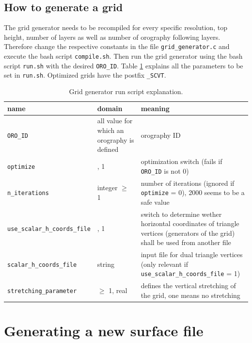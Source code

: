 \documentclass[10pt]{report}
\begin{document}
\section{How to generate a grid}
\label{sec:how_to_generate_a_grid}

The grid generator needs to be recompiled for every specific resolution, top height, number of layers as well as number of orography following layers. Therefore change the respective constants in the file \texttt{grid\_generator.c} and execute the bash script \texttt{compile.sh}. Then run the grid generator using the bash script \texttt{run.sh} with the desired \texttt{\texttt{ORO\_ID}}. Table \ref{tab:grid_generator_run_file_explanation} explains all the parameters to be set in \texttt{run.sh}. Optimized grids have the postfix \texttt{\_SCVT}.

\renewcommand{\arraystretch}{1.2}
\begin{table}
\centering
\begin{tabular}{|>{\centering}p{5.0 cm}|>{\centering}p{3 cm}|>{\centering}p{7 cm}|}
\hline \textbf{name} & \textbf{domain} & \textbf{meaning} \tabularnewline
\hline\hline \texttt{\texttt{ORO\_ID}} & all value for which an orography is defined & orography ID \tabularnewline
\hline\hline \texttt{optimize} & 0, 1 & optimization switch (fails if \texttt{\texttt{ORO\_ID}} is not 0) \tabularnewline
\hline\hline \texttt{n\_iterations} & integer $\geq$ 1 & number of iterations (ignored if \texttt{optimize} = 0), 2000 seems to be a safe value \tabularnewline
\hline\hline \texttt{use\_scalar\_h\_coords\_file} & 0, 1 & switch to determine wether horizontal coordinates of triangle vertices (generators of the grid) shall be used from another file \tabularnewline
\hline\hline \texttt{scalar\_h\_coords\_file} & string & input file for dual triangle vertices (only relevant if \texttt{use\_scalar\_h\_coords\_file} = 1) \tabularnewline
\hline\hline \texttt{stretching\_parameter} & $\geq$ 1, real & defines the vertical stretching of the grid, one means no stretching \tabularnewline
\hline
\end{tabular}
\caption{Grid generator run script explanation.}
\label{tab:grid_generator_run_file_explanation}
\end{table}
\renewcommand{\arraystretch}{1}

\chapter{Generating a new surface file}
\label{chap:generating_a_new_surface_file}
\end{document}
